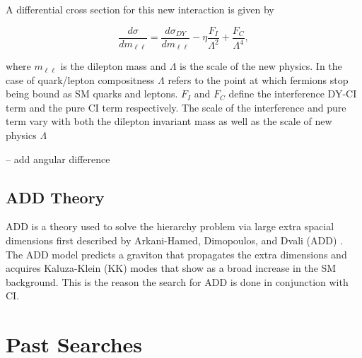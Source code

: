         A differential cross section for this new interaction is given by

        \begin{equation}
            \frac{d\sigma}{dm_{\ell\ell}} = 
                \frac{d\sigma_{DY}}{dm_{\ell\ell}} 
                - \eta\frac{F_{I}}{\Lambda^{2}} 
                + \frac{F_{C}}{\Lambda^{4}},
            \label{eq:DiffCross}
        \end{equation}

        where $m_{\ell\ell}$ is the dilepton mass and $\Lambda$ is the scale of the new physics. In the case of quark/lepton compositness $\Lambda$ refers to the point at which fermions stop being bound as SM quarks and leptons. $F_{I}$ and $F_{C}$ define the interference DY-CI term and the pure CI term respectively. The scale of the interference and pure term vary with both the dilepton invariant mass as well as the scale of new physics $\Lambda$

        -- add angular difference




    \subsection{ADD Theory}
        ADD is a theory used to solve the hierarchy problem via large extra spacial dimensions first described by Arkani-Hamed, Dimopoulos, and Dvali (ADD) \cite{ADD}. The ADD model predicts a graviton that propagates the extra dimensions and acquires Kaluza-Klein (KK) modes that show as a broad increase in the SM background. This is the reason the search for ADD is done in conjunction with CI.




\section{Past Searches}











